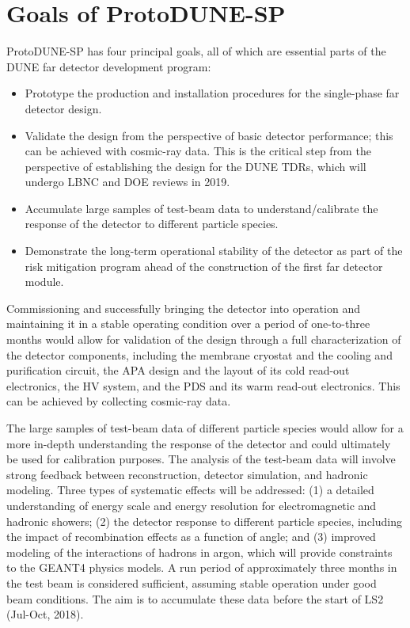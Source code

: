 \section{Goals of ProtoDUNE-SP}
\label{intro:goals}
ProtoDUNE-SP has four principal goals, all of which are essential parts of the DUNE far detector development program:
\begin{itemize}
\item Prototype the production and installation procedures for the single-phase far detector design.
\item Validate the design from the perspective of basic detector performance; this can be achieved with cosmic-ray data. 
This is the critical step from the perspective of establishing the design for the DUNE TDRs, which will undergo LBNC and DOE reviews in 2019.
\item Accumulate large samples of test-beam data to understand/calibrate the response of the detector to different particle species. 
\item Demonstrate the long-term operational stability of the detector as part of the risk mitigation program ahead of the construction of the first  far detector module.
\end{itemize}
Commissioning and successfully bringing the detector into operation and maintaining it in a stable operating condition over a period of %
one-to-three months would allow for validation of the design through a full characterization of the detector components, including the membrane cryostat and the cooling and purification circuit, the APA design and the layout of its cold read-out electronics, the HV system, and the PDS and its warm read-out electronics. This can be achieved by collecting cosmic-ray data. 

The large samples of test-beam data of different particle species would allow for a more in-depth understanding the response of the detector and could ultimately be used for calibration purposes. The analysis of the test-beam data will involve strong feedback 
between reconstruction, detector simulation, and hadronic modeling. Three types of systematic effects will be addressed: (1) a detailed understanding of energy scale and energy resolution for electromagnetic and hadronic showers; (2) the detector response to different particle species, including %
the impact of recombination effects as a function of angle; and (3) improved modeling of the interactions of hadrons in argon, which will provide constraints to the GEANT4 physics models.  A run period of approximately three months in the test beam is considered sufficient, assuming stable operation under good beam conditions. The aim is to accumulate these data before the start of LS2 (Jul-Oct, 2018). 

